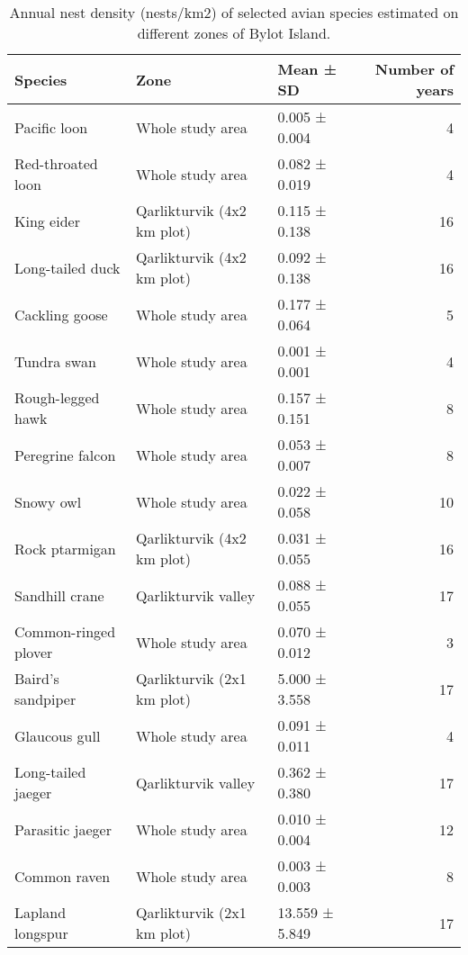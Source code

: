 \begin{table}[ht]
\centering
\caption{Annual nest density (nests/km2) of selected avian species estimated on different zones of Bylot Island.} 
\label{table:interannual_nest_density_variation}
\begingroup\fontsize{10pt}{10pt}\selectfont
\begin{tabularx}{0.9\textwidth}{lllr}
  \hline
Species & Zone & Mean ± SD & Number of years \\ 
  \hline
Pacific loon & Whole study area & 0.005 ± 0.004 &   4 \\ 
  Red-throated loon & Whole study area & 0.082 ± 0.019 &   4 \\ 
  King eider & Qarlikturvik (4x2 km plot) & 0.115 ± 0.138 &  16 \\ 
  Long-tailed duck & Qarlikturvik (4x2 km plot) & 0.092 ± 0.138 &  16 \\ 
  Cackling goose & Whole study area & 0.177 ± 0.064 &   5 \\ 
  Tundra swan & Whole study area & 0.001 ± 0.001 &   4 \\ 
  Rough-legged hawk & Whole study area & 0.157 ± 0.151 &   8 \\ 
  Peregrine falcon & Whole study area & 0.053 ± 0.007 &   8 \\ 
  Snowy owl & Whole study area & 0.022 ± 0.058 &  10 \\ 
  Rock ptarmigan & Qarlikturvik (4x2 km plot) & 0.031 ± 0.055 &  16 \\ 
  Sandhill crane & Qarlikturvik valley & 0.088 ± 0.055 &  17 \\ 
  Common-ringed plover & Whole study area & 0.070 ± 0.012 &   3 \\ 
  Baird's sandpiper & Qarlikturvik (2x1 km plot) & 5.000 ± 3.558 &  17 \\ 
  Glaucous gull & Whole study area & 0.091 ± 0.011 &   4 \\ 
  Long-tailed jaeger & Qarlikturvik valley & 0.362 ± 0.380 &  17 \\ 
  Parasitic jaeger & Whole study area & 0.010 ± 0.004 &  12 \\ 
  Common raven & Whole study area & 0.003 ± 0.003 &   8 \\ 
  Lapland longspur & Qarlikturvik (2x1 km plot) & 13.559 ± 5.849 &  17 \\ 
   \hline
\end{tabularx}
\endgroup
\end{table}
